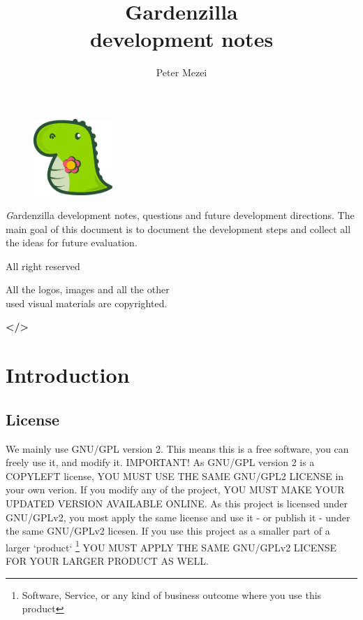 \documentclass{article}
\author{Peter Mezei}
\title{Gardenzilla \\ development notes}
\begin{document}
\maketitle
\thispagestyle{empty}
\newpage
\thispagestyle{empty}
\begin{figure}
  \centering
  \includegraphics[width=3cm]{logo.png}
\end{figure}
\begin{center}
  {\textit  Gardenzilla development notes, questions and future development directions. The main goal of this document is to document the development steps and collect all the ideas for future evaluation.

    \vspace{1cm} All right reserved \the\year{}

    All the logos, images and all the other\\ used visual materials are copyrighted.
  }
\end{center}
\vspace{11cm}
\begin{center}
  {\textbf {\huge </>}}
\end{center}
\newpage
\thispagestyle{empty}
\tableofcontents
\newpage
\section{Introduction}

\subsection{License}


We mainly use GNU/GPL version 2. This means this is a free software,
you can freely use it, and modify it. IMPORTANT! As GNU/GPL version 2
is a COPYLEFT license, YOU MUST USE THE SAME GNU/GPL2 LICENSE in your
own verion. If you modify any of the project, YOU MUST MAKE YOUR
UPDATED VERSION AVAILABLE ONLINE. As this project is licensed under
GNU/GPLv2, you most apply the same license and use it - or publish it
- under the same GNU/GPLv2 licesen. If you use this project as a smaller
part of a larger `product`
\footnote{Software, Service, or any kind of
  business outcome where you use this product}
YOU MUST APPLY THE SAME GNU/GPLv2 LICENSE FOR YOUR LARGER PRODUCT AS WELL.
\end{document}
